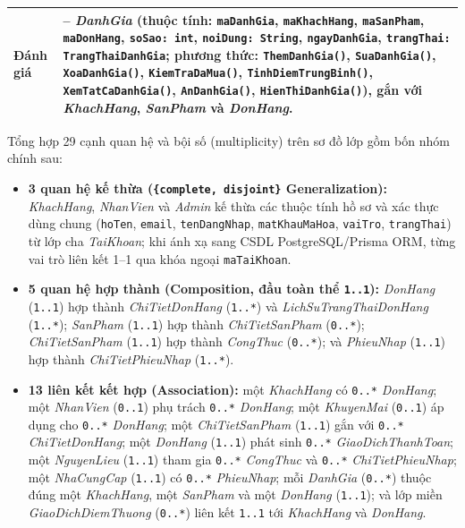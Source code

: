 \documentclass[12pt,a4paper]{report}
\begin{document}
\begin{longtable}{>{\raggedright\arraybackslash}p{3.8cm}>{\raggedright\arraybackslash}p{11.4cm}}
\hline
Đánh giá & -- \textit{DanhGia} (thuộc tính: \texttt{maDanhGia}, \texttt{maKhachHang}, \texttt{maSanPham}, \texttt{maDonHang}, \texttt{soSao: int}, \texttt{noiDung: String}, \texttt{ngayDanhGia}, \texttt{trangThai: TrangThaiDanhGia}; phương thức: \texttt{ThemDanhGia()}, \texttt{SuaDanhGia()}, \texttt{XoaDanhGia()}, \texttt{KiemTraDaMua()}, \texttt{TinhDiemTrungBinh()}, \texttt{XemTatCaDanhGia()}, \texttt{AnDanhGia()}, \texttt{HienThiDanhGia()}), gắn với \textit{KhachHang}, \textit{SanPham} và \textit{DonHang}. \\
\hline
\end{longtable}

\begin{sloppypar}
Tổng hợp 29 cạnh quan hệ và bội số (multiplicity) trên sơ đồ lớp  gồm bốn nhóm chính sau:
\begin{itemize}[leftmargin=*,nosep]
  \item \textbf{3 quan hệ kế thừa (\texttt{\{complete, disjoint\}} Generalization):} \textit{KhachHang}, \textit{NhanVien} và \textit{Admin} kế thừa các thuộc tính hồ sơ và xác thực dùng chung (\texttt{hoTen}, \texttt{email}, \texttt{tenDangNhap}, \texttt{matKhauMaHoa}, \texttt{vaiTro}, \texttt{trangThai}) từ lớp cha \textit{TaiKhoan}; khi ánh xạ sang CSDL PostgreSQL/Prisma ORM, từng vai trò liên kết 1--1 qua khóa ngoại \texttt{maTaiKhoan}.
  \item \textbf{5 quan hệ hợp thành (Composition, đầu toàn thể \texttt{1..1}):} \textit{DonHang} (\texttt{1..1}) hợp thành \textit{ChiTietDonHang} (\texttt{1..*}) và \textit{LichSuTrangThaiDonHang} (\texttt{1..*}); \textit{SanPham} (\texttt{1..1}) hợp thành \textit{ChiTietSanPham} (\texttt{0..*}); \textit{ChiTietSanPham} (\texttt{1..1}) hợp thành \textit{CongThuc} (\texttt{0..*}); và \textit{PhieuNhap} (\texttt{1..1}) hợp thành \textit{ChiTietPhieuNhap} (\texttt{1..*}).
  \item \textbf{13 liên kết kết hợp (Association):} một \textit{KhachHang} có \texttt{0..*} \textit{DonHang}; một \textit{NhanVien} (\texttt{0..1}) phụ trách \texttt{0..*} \textit{DonHang}; một \textit{KhuyenMai} (\texttt{0..1}) áp dụng cho \texttt{0..*} \textit{DonHang}; một \textit{ChiTietSanPham} (\texttt{1..1}) gắn với \texttt{0..*} \textit{ChiTietDonHang}; một \textit{DonHang} (\texttt{1..1}) phát sinh \texttt{0..*} \textit{GiaoDichThanhToan}; một \textit{NguyenLieu} (\texttt{1..1}) tham gia \texttt{0..*} \textit{CongThuc} và \texttt{0..*} \textit{ChiTietPhieuNhap}; một \textit{NhaCungCap} (\texttt{1..1}) có \texttt{0..*} \textit{PhieuNhap}; mỗi \textit{DanhGia} (\texttt{0..*}) thuộc đúng một \textit{KhachHang}, một \textit{SanPham} và một \textit{DonHang} (\texttt{1..1}); và lớp miền \textit{GiaoDichDiemThuong} (\texttt{0..*}) liên kết \texttt{1..1} tới \textit{KhachHang} và \textit{DonHang}.

\end{itemize}
\end{sloppypar}
\end{document}
